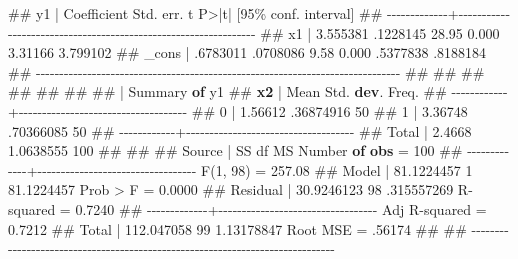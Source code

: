 \documentclass[
  letterpaper,
  DIV=11,
  numbers=noendperiod]{scrreprt}
\newenvironment{Shaded}{\begin{snugshade}}{\end{snugshade}}
\newcommand{\DataTypeTok}[1]{\textcolor[rgb]{0.68,0.00,0.00}{#1}}
\newcommand{\FunctionTok}[1]{\textcolor[rgb]{0.28,0.35,0.67}{#1}}
\newcommand{\KeywordTok}[1]{\textcolor[rgb]{0.00,0.23,0.31}{\textbf{#1}}}
\newcommand{\NormalTok}[1]{\textcolor[rgb]{0.00,0.23,0.31}{#1}}
\begin{document}
\begin{Shaded}
\begin{Highlighting}[]
\NormalTok{\#\#           y1 | Coefficient  Std. err.      t    P\textgreater{}|t|     [95\% conf. interval]}
\NormalTok{\#\# {-}{-}{-}{-}{-}{-}{-}{-}{-}{-}{-}{-}{-}+{-}{-}{-}{-}{-}{-}{-}{-}{-}{-}{-}{-}{-}{-}{-}{-}{-}{-}{-}{-}{-}{-}{-}{-}{-}{-}{-}{-}{-}{-}{-}{-}{-}{-}{-}{-}{-}{-}{-}{-}{-}{-}{-}{-}{-}{-}{-}{-}{-}{-}{-}{-}{-}{-}{-}{-}{-}{-}{-}{-}{-}{-}{-}{-}}
\NormalTok{\#\#           x1 |   3.555381   .1228145    28.95   0.000      3.31166    3.799102}
\NormalTok{\#\#        }\DataTypeTok{\_cons}\NormalTok{ |   .6783011   .0708086     9.58   0.000     .5377838    .8188184}
\NormalTok{\#\# {-}{-}{-}{-}{-}{-}{-}{-}{-}{-}{-}{-}{-}{-}{-}{-}{-}{-}{-}{-}{-}{-}{-}{-}{-}{-}{-}{-}{-}{-}{-}{-}{-}{-}{-}{-}{-}{-}{-}{-}{-}{-}{-}{-}{-}{-}{-}{-}{-}{-}{-}{-}{-}{-}{-}{-}{-}{-}{-}{-}{-}{-}{-}{-}{-}{-}{-}{-}{-}{-}{-}{-}{-}{-}{-}{-}{-}{-}}
\NormalTok{\#\# }
\NormalTok{\#\# }
\NormalTok{\#\# }
\NormalTok{\#\# }
\NormalTok{\#\# }
\NormalTok{\#\# }
\NormalTok{\#\#             |            Summary }\KeywordTok{of}\NormalTok{ y1}
\NormalTok{\#\#          }\KeywordTok{x2}\NormalTok{ |        Mean   Std. }\KeywordTok{dev}\NormalTok{.       Freq.}
\NormalTok{\#\# {-}{-}{-}{-}{-}{-}{-}{-}{-}{-}{-}{-}+{-}{-}{-}{-}{-}{-}{-}{-}{-}{-}{-}{-}{-}{-}{-}{-}{-}{-}{-}{-}{-}{-}{-}{-}{-}{-}{-}{-}{-}{-}{-}{-}{-}{-}{-}{-}}
\NormalTok{\#\#           0 |     1.56612   .36874916          50}
\NormalTok{\#\#           1 |     3.36748   .70366085          50}
\NormalTok{\#\# {-}{-}{-}{-}{-}{-}{-}{-}{-}{-}{-}{-}+{-}{-}{-}{-}{-}{-}{-}{-}{-}{-}{-}{-}{-}{-}{-}{-}{-}{-}{-}{-}{-}{-}{-}{-}{-}{-}{-}{-}{-}{-}{-}{-}{-}{-}{-}{-}}
\NormalTok{\#\#       Total |      2.4668   1.0638555         100}
\NormalTok{\#\# }
\NormalTok{\#\# }
\NormalTok{\#\#       Source |       SS           df       MS      Number }\KeywordTok{of} \KeywordTok{obs}\NormalTok{   =       100}
\NormalTok{\#\# {-}{-}{-}{-}{-}{-}{-}{-}{-}{-}{-}{-}{-}+{-}{-}{-}{-}{-}{-}{-}{-}{-}{-}{-}{-}{-}{-}{-}{-}{-}{-}{-}{-}{-}{-}{-}{-}{-}{-}{-}{-}{-}{-}{-}{-}{-}{-}   }\FunctionTok{F}\NormalTok{(1, 98)        =    257.08}
\NormalTok{\#\#        Model |  81.1224457         1  81.1224457   Prob \textgreater{} }\FunctionTok{F}\NormalTok{        =    0.0000}
\NormalTok{\#\#     Residual |  30.9246123        98  .315557269   R{-}squared       =    0.7240}
\NormalTok{\#\# {-}{-}{-}{-}{-}{-}{-}{-}{-}{-}{-}{-}{-}+{-}{-}{-}{-}{-}{-}{-}{-}{-}{-}{-}{-}{-}{-}{-}{-}{-}{-}{-}{-}{-}{-}{-}{-}{-}{-}{-}{-}{-}{-}{-}{-}{-}{-}   Adj R{-}squared   =    0.7212}
\NormalTok{\#\#        Total |  112.047058        99  1.13178847   Root MSE        =    .56174}
\NormalTok{\#\# }
\NormalTok{\#\# {-}{-}{-}{-}{-}{-}{-}{-}{-}{-}{-}{-}{-}{-}{-}{-}{-}{-}{-}{-}{-}{-}{-}{-}{-}{-}{-}{-}{-}{-}{-}{-}{-}{-}{-}{-}{-}{-}{-}{-}{-}{-}{-}{-}{-}{-}{-}{-}{-}{-}{-}{-}{-}{-}{-}{-}{-}{-}{-}{-}{-}{-}{-}{-}{-}{-}{-}{-}{-}{-}{-}{-}{-}{-}{-}{-}{-}{-}}

\end{Highlighting}
\end{Shaded}
\end{document}
